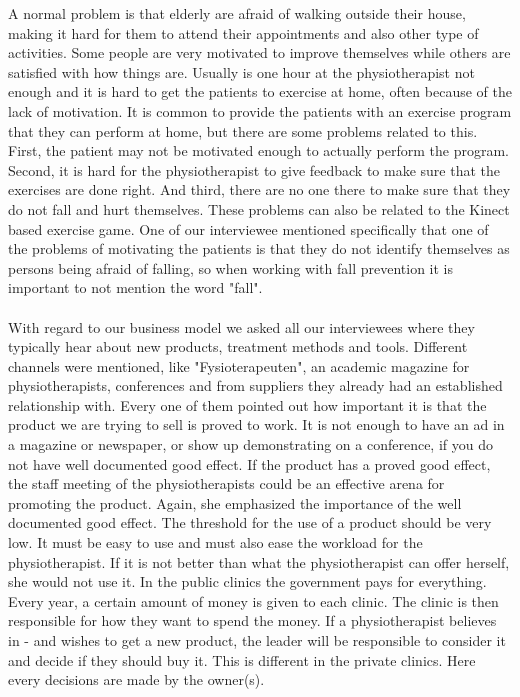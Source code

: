 A normal problem is that elderly are afraid of walking outside their house, making it hard for them to attend their appointments and also other type of activities. Some people are very motivated to improve themselves while others are satisfied with how things are. Usually is one hour at the physiotherapist not enough and it is hard to get the patients to exercise at home, often because of the lack of motivation. It is common to provide the patients with an exercise program that they can perform at home, but there are some problems related to this. First, the patient may not be motivated enough to actually perform the program. Second, it is hard for the physiotherapist to give feedback to make sure that the exercises are done right. And third, there are no one there to make sure that they do not fall and hurt themselves. These problems can also be related to the Kinect based exercise game. One of our interviewee mentioned specifically that one of the problems of motivating the patients is that they do not identify themselves as  persons being afraid of falling, so when working with fall prevention it is important to not mention the word "fall". \\ \\
With regard to our business model we asked all our interviewees where they typically hear about new products, treatment methods and tools. Different channels were mentioned, like "Fysioterapeuten", an academic magazine for physiotherapists, conferences and from suppliers they already had an established relationship with. Every one of them pointed out how important it is that the product we are trying to sell is proved to work. It is not enough to have an ad in a magazine or newspaper, or show up demonstrating on a conference, if you do not have well documented good effect. If the product has a proved good effect, the staff meeting of the physiotherapists could be an effective arena for promoting the product. Again, she emphasized the importance of the well documented good effect. The threshold for the use of a product should be very low. It must be easy to use and must also ease the workload for the physiotherapist. If it is not better than what the physiotherapist can offer herself, she would not use it. In the public clinics the government pays for everything. Every year, a certain amount of money is given to each clinic. The clinic is then responsible for how they want to spend the money. If a physiotherapist believes in - and wishes to get a new product, the leader will be responsible to consider it and decide if they should buy it. This is different in the private clinics. Here every decisions are made by the owner(s). \\ \\

